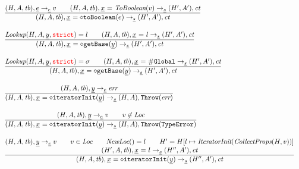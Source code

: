 \[\begin{array}{l@{~~}l@{~~}ll}
\frac{\begin{matrix}
\evale, \ir{\expr} \rightarrow_{\ir\expr} v
\rulesep
\state, \irid \ {\tt =} \ \hf{ToBoolean}(v) \rightarrow_{\ir\stmt} \resp, \ct
\end{matrix}}{\begin{matrix}
\state, \irid \ {\tt = {\diamond}toBoolean}(e)  \rightarrow_{\ir\stmt} \resp, \ct
\end{matrix}}
\\[2em]

\frac{\begin{matrix}
\hf{Lookup}(H,A,\ir{y},\strict) = l
\rulesep
\state, \irid \ {\tt =} \ l \rightarrow_{\ir\stmt} \resp, \ct
\end{matrix}}{\begin{matrix}
\state, \irid \ {\tt = {\diamond}getBase}(\ir{y})  \rightarrow_{\ir\stmt} \resp, \ct
\end{matrix}}
\\[2em]

\frac{\begin{matrix}
\hf{Lookup}(H,A,\ir{y},\strict) = \er
\rulesep
\state, \irid \ {\tt =} \ \lg \rightarrow_{\ir\stmt} \resp, \ct
\end{matrix}}{\begin{matrix}
\state, \irid \ {\tt = {\diamond}getBase}(\ir{y})  \rightarrow_{\ir\stmt} \resp, \ct
\end{matrix}}
\\[2em]

\frac{\begin{matrix}
\evale, \ir{y} \rightarrow_{\ir\expr} \err
\end{matrix}}{\begin{matrix}
\state, \irid \ {\tt = {\diamond}iteratorInit}(\ir{y})  \rightarrow_{\ir\stmt} \res, \error
\end{matrix}}
\\[2em]

\frac{\begin{matrix}
\evale, \ir{y} \rightarrow_{\ir\expr} v
\rulesep
v\not\in\Loc
\end{matrix}}{\begin{matrix}
\state, \irid \ {\tt = {\diamond}iteratorInit}(\ir{y})  \rightarrow_{\ir\stmt} \res, \thte
\end{matrix}}
\\[2em]

\frac{\begin{matrix}
\evale, \ir{y} \rightarrow_{\ir\expr} v
\rulesep
v\in\Loc
\rulesep
\hf{NewLoc}() = l
\rulesep
H' = H[l \mapsto \hf{IteratorInit}(\hf{CollectProps}(H,v))]
\\
(H', A, \tb), \irid \ {\tt =} \ l \rightarrow_{\ir\stmt} (H'', A'), \ct
\end{matrix}}{\begin{matrix}
\state, \irid \ {\tt = {\diamond}iteratorInit}(\ir{y})  \rightarrow_{\ir\stmt} (H'', A'), \ct
\end{matrix}}
\\[2em]


\end{array}\]
